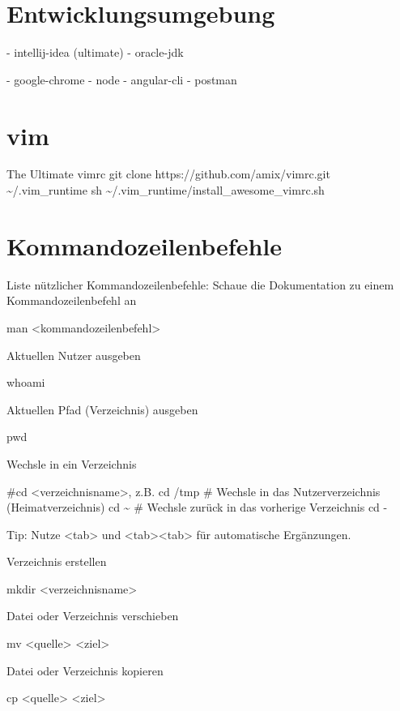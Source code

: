 \documentclass[]{article}
\begin{document}
\section{Entwicklungsumgebung}

    
- intellij-idea (ultimate)
- oracle-jdk

- google-chrome
- node
- angular-cli
- postman

\section{vim}
The Ultimate vimrc
git clone https://github.com/amix/vimrc.git \~{}/.vim\_runtime
sh \~{}/.vim\_runtime/install\_awesome\_vimrc.sh

\section{Kommandozeilenbefehle}
Liste nützlicher Kommandozeilenbefehle:
Schaue die Dokumentation zu einem Kommandozeilenbefehl an
\begin{bashcode}
man <kommandozeilenbefehl>
\end{bashcode}

Aktuellen Nutzer ausgeben
\begin{bashcode}
whoami
\end{bashcode}

Aktuellen Pfad (Verzeichnis) ausgeben
\begin{bashcode}
pwd
\end{bashcode}

Wechsle in ein Verzeichnis
\begin{bashcode}
#cd <verzeichnisname>, z.B.
cd /tmp
# Wechsle in das Nutzerverzeichnis (Heimatverzeichnis)
cd \~
# Wechsle zurück in das vorherige Verzeichnis
cd -
\end{bashcode}

Tip: Nutze <tab> und <tab><tab> für automatische Ergänzungen.

Verzeichnis erstellen
\begin{bashcode}
mkdir <verzeichnisname>
\end{bashcode}

Datei oder Verzeichnis verschieben
\begin{bashcode}
mv <quelle> <ziel>
\end{bashcode}

Datei oder Verzeichnis kopieren
\begin{bashcode}
cp <quelle> <ziel>
\end{bashcode}
\end{document}
